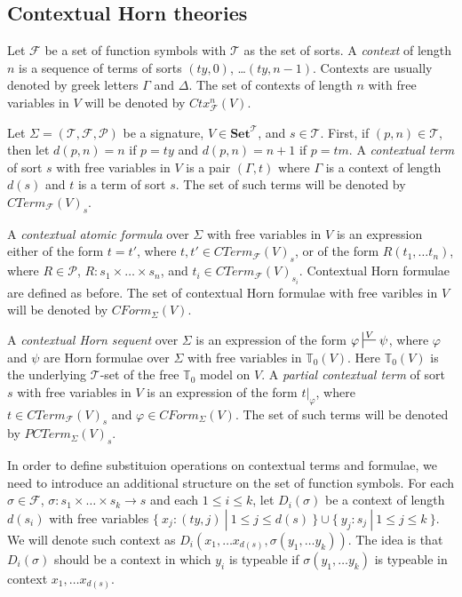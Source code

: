 \documentclass[reqno]{amsart}
\theoremstyle{definition}
\theoremstyle{remark}
\newcommand{\cat}[1]{\mathbf{#1}}
\newcommand{\Set}{\cat{Set}}
\numberwithin{figure}{section}
\begin{document}
\subsection{Contextual Horn theories}

Let $\mathcal{F}$ be a set of function symbols with $\mathcal{T}$ as the set of sorts.
A \emph{context} of length $n$ is a sequence of terms of sorts $(ty,0)$, \ldots $(ty,n-1)$.
Contexts are usually denoted by greek letters $\Gamma$ and $\Delta$.
The set of contexts of length $n$ with free variables in $V$ will be denoted by $Ctx^n_\mathcal{F}(V)$.

Let $\Sigma = (\mathcal{T}, \mathcal{F}, \mathcal{P})$ be a signature, $V \in \Set^\mathcal{T}$, and $s \in \mathcal{T}$.
First, if $(p,n) \in \mathcal{T}$, then let $d(p,n) = n$ if $p = ty$ and $d(p,n) = n+1$ if $p = tm$.
A \emph{contextual term} of sort $s$ with free variables in $V$ is a pair $(\Gamma,t)$ where $\Gamma$ is a context of length $d(s)$ and $t$ is a term of sort $s$.
The set of such terms will be denoted by $CTerm_\mathcal{F}(V)_s$.

A \emph{contextual atomic formula} over $\Sigma$ with free variables in $V$ is an expression either of the form $t = t'$, where $t,t' \in CTerm_\mathcal{F}(V)_s$,
    or of the form $R(t_1, \ldots t_n)$, where $R \in \mathcal{P}$, $R : s_1 \times \ldots \times s_n$, and $t_i \in CTerm_\mathcal{F}(V)_{s_i}$.
Contextual Horn formulae are defined as before.
The set of contextual Horn formulae with free varibles in $V$ will be denoted by $CForm_\Sigma(V)$.

A \emph{contextual Horn sequent} over $\Sigma$ is an expression of the form $\varphi \sststile{}{V} \psi$,
    where $\varphi$ and $\psi$ are Horn formulae over $\Sigma$ with free variables in $\mathbb{T}_0(V)$.
Here $\mathbb{T}_0(V)$ is the underlying $\mathcal{T}$-set of the free $\mathbb{T}_0$ model on $V$.
A \emph{partial contextual term} of sort $s$ with free variables in $V$ is an expression of the form $t|_\varphi$,
where $t \in CTerm_\mathcal{F}(V)_s$ and $\varphi \in CForm_\Sigma(V)$.
The set of such terms will be denoted by $PCTerm_\Sigma(V)_s$.

In order to define substituion operations on contextual terms and formulae, we need to introduce an additional structure on the set of function symbols.
For each $\sigma \in \mathcal{F}$, $\sigma : s_1 \times \ldots \times s_k \to s$ and each $1 \leq i \leq k$,
    let $D_i(\sigma)$ be a context of length $d(s_i)$ with free variables $\{\ x_j : (ty,j)\ |\ 1 \leq j \leq d(s)\ \} \cup \{\ y_j : s_j\ |\ 1 \leq j \leq k\ \}$.
We will denote such context as $D_i(x_1, \ldots x_{d(s)}, \sigma(y_1, \ldots y_k))$.
The idea is that $D_i(\sigma)$ should be a context in which $y_i$ is typeable if $\sigma(y_1, \ldots y_k)$ is typeable in context $x_1, \ldots x_{d(s)}$.
\end{document}
